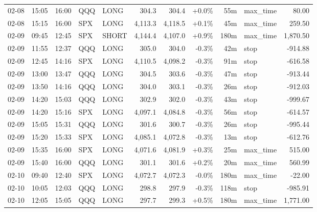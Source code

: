 \documentclass[11pt,a4paper,twoside]{article}
\begin{document}
\begin{center}
\begin{longtable}{>{\color{txtmain}}l l l l l r r r r >{\color{txtmain}}l r}
02-08 & 15:05 & 16:00 & QQQ & LONG & 304.3 & 304.4 & \textcolor{wingreen}{+0.0\%} & 55m & max\_time & \textcolor{wingreen}{80.00} \\
02-08 & 15:15 & 16:00 & SPX & LONG & 4,113.3 & 4,118.5 & \textcolor{wingreen}{+0.1\%} & 45m & max\_time & \textcolor{wingreen}{259.50} \\
02-09 & 09:45 & 12:45 & SPX & SHORT & 4,144.4 & 4,107.0 & \textcolor{wingreen}{+0.9\%} & 180m & max\_time & \textcolor{wingreen}{1,870.50} \\
02-09 & 11:55 & 12:37 & QQQ & LONG & 305.0 & 304.0 & \textcolor{lossred}{-0.3\%} & 42m & stop & \textcolor{lossred}{-914.88} \\
02-09 & 12:45 & 14:16 & SPX & LONG & 4,110.5 & 4,098.2 & \textcolor{lossred}{-0.3\%} & 91m & stop & \textcolor{lossred}{-616.58} \\
02-09 & 13:00 & 13:47 & QQQ & LONG & 304.5 & 303.6 & \textcolor{lossred}{-0.3\%} & 47m & stop & \textcolor{lossred}{-913.44} \\
02-09 & 13:50 & 14:16 & QQQ & LONG & 304.0 & 303.1 & \textcolor{lossred}{-0.3\%} & 26m & stop & \textcolor{lossred}{-912.03} \\
02-09 & 14:20 & 15:03 & QQQ & LONG & 302.9 & 302.0 & \textcolor{lossred}{-0.3\%} & 43m & stop & \textcolor{lossred}{-999.67} \\
02-09 & 14:20 & 15:16 & SPX & LONG & 4,097.1 & 4,084.8 & \textcolor{lossred}{-0.3\%} & 56m & stop & \textcolor{lossred}{-614.57} \\
02-09 & 15:05 & 15:31 & QQQ & LONG & 301.6 & 300.7 & \textcolor{lossred}{-0.3\%} & 26m & stop & \textcolor{lossred}{-995.44} \\
02-09 & 15:20 & 15:33 & SPX & LONG & 4,085.1 & 4,072.8 & \textcolor{lossred}{-0.3\%} & 13m & stop & \textcolor{lossred}{-612.76} \\
02-09 & 15:35 & 16:00 & SPX & LONG & 4,071.6 & 4,081.9 & \textcolor{wingreen}{+0.3\%} & 25m & max\_time & \textcolor{wingreen}{515.00} \\
02-09 & 15:40 & 16:00 & QQQ & LONG & 301.1 & 301.6 & \textcolor{wingreen}{+0.2\%} & 20m & max\_time & \textcolor{wingreen}{560.99} \\
02-10 & 09:40 & 12:40 & SPX & LONG & 4,072.7 & 4,072.3 & \textcolor{lossred}{-0.0\%} & 180m & max\_time & \textcolor{lossred}{-22.00} \\
02-10 & 10:05 & 12:03 & QQQ & LONG & 298.8 & 297.9 & \textcolor{lossred}{-0.3\%} & 118m & stop & \textcolor{lossred}{-985.91} \\
02-10 & 12:05 & 15:05 & QQQ & LONG & 297.7 & 299.3 & \textcolor{wingreen}{+0.5\%} & 180m & max\_time & \textcolor{wingreen}{1,771.00} \\

\end{longtable}
\end{center}
\end{document}
